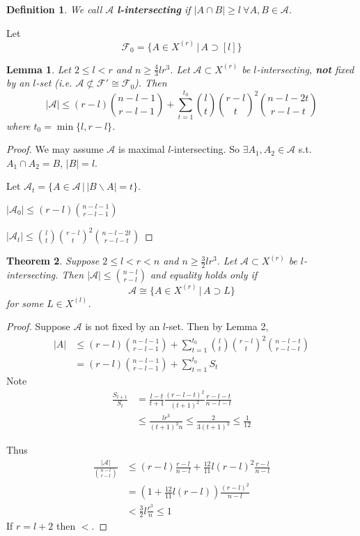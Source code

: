 \documentclass[a4paper]{article}
\newtheorem*{definition}{Definition}
\newtheorem{theorem}{Theorem}
\newtheorem{lemma}[theorem]{Lemma}
\newcommand*\abs[1]{\left|#1\right|}
\begin{document}
\begin{definition}
	We call $\mathcal{A}$ \textbf{l-intersecting} if $\abs{A \cap B} \geq l\ \forall A, B \in \mathcal{A}$.
\end{definition}

Let $$\mathcal{F}_0 = \{A \in X^{(r)} \,|\, A \supset [l] \}$$

\begin{lemma}
	Let $2 \leq l < r$ and $n \geq \frac{4}{3}lr^3$.
	Let $\mathcal{A} \subset X^{(r)}$ be $l$-intersecting,
	\textbf{not} fixed by an $l$-set (i.e. $\mathcal{A} \not\subset \mathcal{F}' \cong \mathcal{F}_0$).
	Then
	$$\abs{\mathcal{A}} \leq (r-l){n-l-1 \choose r-l-1} + \sum_{t=1}^{t_0} {l \choose t}{r-l \choose t}^2{n-l-2t \choose r-l-t}$$
	where $t_0 = \min\{l, r-l\}$.
\end{lemma}
\begin{proof}
	We may assume $\mathcal{A}$ is maximal $l$-intersecting.
	So $\exists A_1, A_2 \in \mathcal{A}$ s.t. $A_1 \cap A_2 = B$, $\abs{B} = l$.
	
	Let $\mathcal{A}_t = \{A \in \mathcal{A} \,|\, \abs{B \backslash A} = t \}$.
	
	$\abs{\mathcal{A}_0} \leq (r-l){n-l-1 \choose r-l-1}$
	
	$\abs{\mathcal{A}_t} \leq {l \choose t}{r-l \choose t}^2{n-l-2t \choose r-l-t}$
\end{proof}

\begin{theorem}
	Suppose $2 \leq l < r < n$ and $n \geq \frac{3}{2}lr^3$.
	Let $\mathcal{A} \subset X^{(r)}$ be $l$-intersecting.
	Then $\abs{\mathcal{A}} \leq {n-l \choose r-l}$ and equality holds only if
	$$\mathcal{A} \cong \{A \in X^{(r)} \,|\, A \supset L\}$$
	for some $L \in X^{(l)}$.
\end{theorem}
\begin{proof}
	Suppose $\mathcal{A}$ is not fixed by an $l$-set.
	Then by Lemma 2,
	\begin{align*}
		\abs{A} &\leq (r-l){n-l-1 \choose r-l-1} + \sum_{t=1}^{t_0}{l \choose t}{r-l \choose t}^2{n-l-t \choose r-l-t} \\
		&= (r-l){n-l-1 \choose r-l-1} + \sum_{t=1}^{t_0} S_t
	\end{align*}
	Note
	\begin{align*}
		\frac{S_{t+1}}{S_t} &= \frac{l-t}{t+1}\frac{(r-l-t)^2}{(t+1)^2}\frac{r-l-t}{n-l-t} \\
		&\leq \frac{lr^3}{(t+1)^3n} \leq \frac{2}{3(t+1)^3} \leq \frac{1}{12}
	\end{align*}
	
	Thus
	\begin{align*}
		\frac{\abs{\mathcal{A}}}{{n-l \choose r-l}} &\leq (r-l)\frac{r-l}{n-l} + \frac{12}{11}l(r-l)^2\frac{r-l}{n-l} \\
		&= (1+\frac{12}{11}l(r-l)) \frac{(r-l)^2}{n-l} \\
		&< \frac{3}{2}l\frac{r^3}{n} \leq 1
	\end{align*}
	If $r=l+2$ then $<$.
\end{proof}
\end{document}
